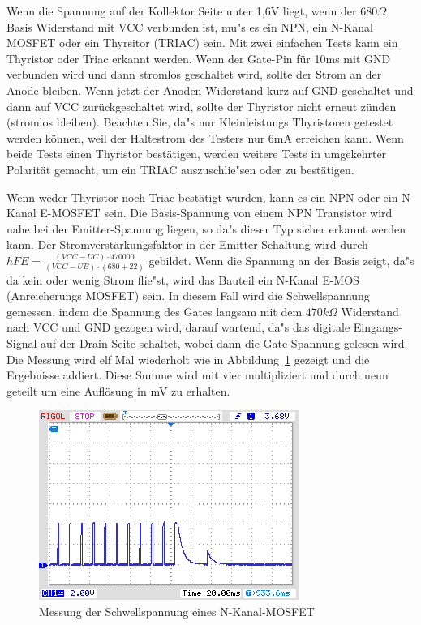 Wenn die Spannung auf der Kollektor Seite unter 1,6V liegt, wenn der \(680\Omega\) Basis Widerstand mit
VCC verbunden ist, mu"s es ein NPN, ein N-Kanal MOSFET oder ein Thyrsitor (TRIAC) sein.
Mit zwei einfachen Tests kann ein Thyristor oder Triac erkannt werden.
Wenn der Gate-Pin f\"ur 10ms mit GND verbunden wird und dann stromlos geschaltet wird, sollte
der Strom an der Anode bleiben.
Wenn jetzt der Anoden-Widerstand kurz auf GND geschaltet und dann auf VCC zur\"uckgeschaltet wird,
sollte der Thyristor nicht erneut z\"unden (stromlos bleiben).
Beachten Sie, da"s nur Kleinleistungs Thyristoren getestet werden k\"onnen, weil der Haltestrom des
Testers nur 6mA erreichen kann.
Wenn beide Tests einen Thyristor best\"atigen, werden weitere Tests in umgekehrter Polarit\"at gemacht,
um ein TRIAC auszuschlie"sen oder zu best\"atigen.

Wenn weder Thyristor noch Triac best\"atigt wurden, kann es ein NPN oder ein N-Kanal E-MOSFET sein.
Die Basis-Spannung von einem NPN Transistor wird nahe bei der Emitter-Spannung liegen, so da"s dieser Typ sicher
erkannt werden kann.
Der Stromverst\"arkungsfaktor in der Emitter-Schaltung wird durch \(hFE = \frac{(VCC-UC)\cdot 470000}{(VCC-UB)\cdot (680+22)}\) 
gebildet.
Wenn die Spannung an der Basis zeigt, da"s da kein oder wenig Strom flie"st, wird das Bauteil ein N-Kanal E-MOS
(Anreicherungs MOSFET) sein. In diesem Fall wird die Schwellspannung gemessen, indem die Spannung des Gates langsam mit
dem \(470k\Omega\) Widerstand nach VCC und GND gezogen wird, darauf wartend, da"s das digitale
Eingangs-Signal auf der Drain Seite schaltet, wobei dann die Gate Spannung gelesen wird.
Die Messung wird elf Mal wiederholt wie in Abbildung~\ref{fig:eleven} gezeigt und die Ergebnisse addiert.
Diese Summe wird mit vier multipliziert und durch neun geteilt um eine Aufl\"osung in mV zu erhalten.
\begin{figure}[H]
\centering
\includegraphics[]{../PNG/IRFU120gate.png}
\caption{Messung der Schwellspannung eines N-Kanal-MOSFET}
\label{fig:eleven}
\end{figure}

